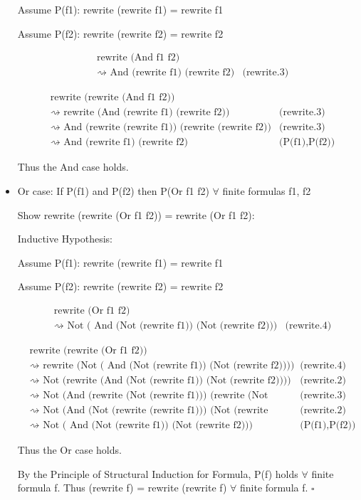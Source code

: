 \documentclass{article}
\begin{document}
\begin{itemize}
Assume P(f1): rewrite (rewrite f1) = rewrite f1

Assume P(f2): rewrite (rewrite f2) = rewrite f2

\begin{align*}
&\text{rewrite (And f1 f2)} \\
&\rightsquigarrow \text{ And (rewrite f1) (rewrite f2)}		&\text{(rewrite.3)}
\end{align*}

\begin{align*}
&\text{rewrite (rewrite (And f1 f2))} \\
&\rightsquigarrow \text{ rewrite (And (rewrite f1) (rewrite f2))}
&\text{(rewrite.3)} \\
&\rightsquigarrow \text{ And (rewrite (rewrite f1)) (rewrite (rewrite f2))}
&\text{(rewrite.3)} \\
&\rightsquigarrow \text{ And (rewrite f1) (rewrite f2)}
&\text{(P(f1),P(f2))}
\end{align*}

Thus the And case holds.

\item Or case: If P(f1) and P(f2) then P(Or f1 f2) $\forall$ finite formulas
f1, f2

Show rewrite (rewrite (Or f1 f2)) = rewrite (Or f1 f2):

Inductive Hypothesis:

Assume P(f1): rewrite (rewrite f1) = rewrite f1

Assume P(f2): rewrite (rewrite f2) = rewrite f2

\begin{align*}
&\text{rewrite (Or f1 f2)} \\
&\rightsquigarrow \text{ Not ( And (Not (rewrite f1)) (Not (rewrite f2)))}	
&\text{(rewrite.4)}
\end{align*}

\begin{align*}
&\text{rewrite (rewrite (Or f1 f2))} \\
&\rightsquigarrow \text{ rewrite (Not ( And (Not (rewrite f1)) (Not (rewrite
f2))))}	&\text{(rewrite.4)} \\
&\rightsquigarrow \text{ Not (rewrite (And (Not (rewrite f1)) (Not (rewrite
f2))))}	
&\text{(rewrite.2)} \\
&\rightsquigarrow \text{ Not (And (rewrite (Not (rewrite f1))) (rewrite (Not
(rewrite f2))))}	&\text{(rewrite.3)} \\
&\rightsquigarrow \text{ Not (And (Not (rewrite (rewrite f1))) (Not
(rewrite (rewrite f2))))}	&\text{(rewrite.2)} \\
&\rightsquigarrow \text{ Not ( And (Not (rewrite f1)) (Not (rewrite f2)))}	
&\text{(P(f1),P(f2))}
\end{align*}

Thus the Or case holds.

By the Principle of Structural Induction for Formula, P(f) holds $\forall$
finite formula f. Thus (rewrite f) = rewrite (rewrite f) $\forall$ finite
formula f. $\square$

\end{itemize}
\end{document}
